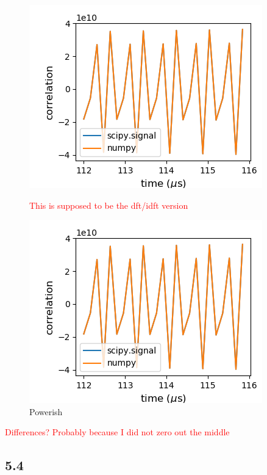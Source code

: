 \documentclass[a4paper]{article}
\begin{document}
\begin{figure}
\centering
\begin{minipage}{.5\textwidth}
	\centering
	\includegraphics[width=.8\linewidth]{5-3/ACF}
	\caption{\textcolor{red}{This is supposed to be the dft/idft version}}
	\label{fig:inverse}
\end{minipage}%
\begin{minipage}{.5\textwidth}
	\centering
	\includegraphics[width=.8\linewidth]{5-3/ACF}
	\caption{Powerish}
	\label{fig:ACF}
\end{minipage}
\end{figure}

\textcolor{red}{Differences? Probably because I did not zero out the middle}

\subsection{5.4}
\end{document}
